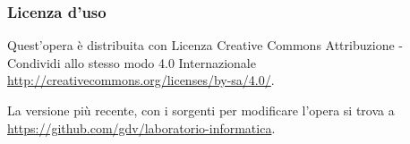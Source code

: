 \documentclass[aspectratio=169]{beamer}
\begin{document}
\begin{frame}[containsverbatim]\frametitle{Licenza d'uso}
  \small
Quest'opera è distribuita con Licenza Creative Commons
Attribuzione - Condividi allo stesso modo 4.0 Internazionale
\url{http://creativecommons.org/licenses/by-sa/4.0/}.

La versione più recente, con i sorgenti per modificare l'opera si trova
a \url{https://github.com/gdv/laboratorio-informatica}.

\end{frame}
\end{document}

